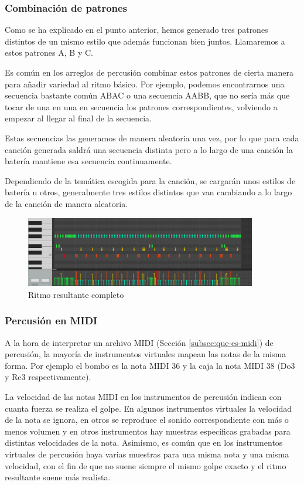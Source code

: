     \subsubsection{Combinación de patrones}
    \label{subsubsec:combinacion-patrones}
        
    Como se ha explicado en el punto anterior, hemos generado tres patrones distintos de un mismo estilo que además funcionan bien juntos. Llamaremos a estos patrones A, B y C.
    
    Es común en los arreglos de percusión combinar estos patrones de cierta manera para añadir variedad al ritmo básico. Por ejemplo, podemos encontrarnos una secuencia bastante común ABAC o una secuencia AABB, que no sería más que tocar de una en una en secuencia los patrones correspondientes, volviendo a empezar al llegar al final de la secuencia.
    
    Estas secuencias las generamos de manera aleatoria una vez, por lo que para cada canción generada saldrá una secuencia distinta pero a lo largo de una canción la batería mantiene esa secuencia continuamente.
    
    Dependiendo de la temática escogida para la canción, se cargarán unos estilos de batería u otros, generalmente tres estilos distintos que van cambiando a lo largo de la canción de manera aleatoria.

    
    \begin{figure}[h]
        \centering
        \includegraphics[width = 0.9\textwidth]{Imagenes/Bitmap/RitmoCompleto.png}
        \caption{Ritmo resultante completo}
        \label{fig:RitmoCompleto}
    \end{figure}
    
    \subsubsection{Percusión en MIDI}
    \label{subsubsec:percusion-midi}

A la hora de interpretar un archivo MIDI (Sección \ref{subsec:que-es-midi}) de percusión, la mayoría de instrumentos virtuales mapean las notas de la misma forma. Por ejemplo el bombo es la nota MIDI 36 y la caja la nota MIDI 38 (Do3 y Re3 respectivamente).

La velocidad de las notas MIDI en los instrumentos de percusión indican con cuanta fuerza se realiza el golpe. En algunos instrumentos virtuales la velocidad de la nota se ignora, en otros se reproduce el sonido correspondiente con más o menos volumen y en otros instrumentos hay muestras específicas grabadas para distintas velocidades de la nota. Asimismo, es común que en los instrumentos virtuales de percusión haya varias muestras para una misma nota y una misma velocidad, con el fin de que no suene siempre el mismo golpe exacto y el ritmo resultante suene más realista.